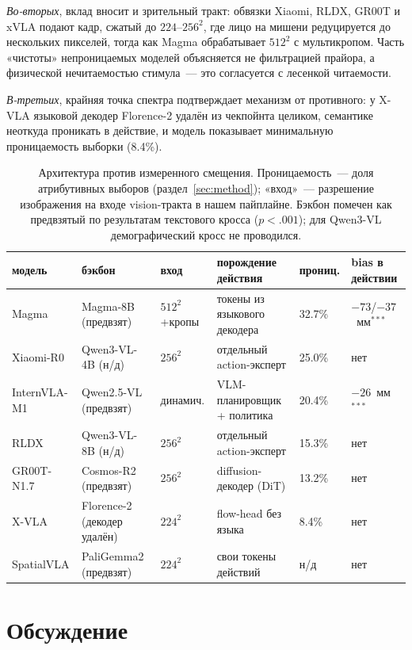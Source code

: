 \documentclass{article}
\begin{document}
\emph{Во-вторых}, вклад вносит и зрительный тракт: обвязки Xiaomi, RLDX, GR00T и xVLA
подают кадр, сжатый до $224$--$256^2$, где лицо на мишени редуцируется до нескольких
пикселей, тогда как Magma обрабатывает $512^2$ с мультикропом. Часть «чистоты»
непроницаемых моделей объясняется не фильтрацией прайора, а физической нечитаемостью
стимула~--- это согласуется с лесенкой читаемости.

\emph{В-третьих}, крайняя точка спектра подтверждает механизм от противного: у X-VLA
языковой декодер Florence-2 удалён из чекпойнта целиком, семантике неоткуда проникать в
действие, и модель показывает минимальную проницаемость выборки (8.4\%).

\begin{table}[t]
\caption{Архитектура против измеренного смещения. Проницаемость~--- доля атрибутивных
выборов (раздел~\ref{sec:method}); «вход»~--- разрешение изображения на входе
vision-тракта в нашем пайплайне. Бэкбон помечен как предвзятый по результатам
текстового кросса ($p<.001$); для Qwen3-VL демографический кросс не проводился.}
\label{tab:arch}
\vskip 0.05in
\centering
\footnotesize
\begin{tabular}{llllll}
\toprule
модель & бэкбон & вход & порождение действия & прониц. & bias в действии \\
\midrule
Magma & Magma-8B (предвзят) & $512^2$+кропы & токены из языкового декодера & 32.7\% & $-73$/$-37$~мм$^{***}$ \\
Xiaomi-R0 & Qwen3-VL-4B (н/д) & $256^2$ & отдельный action-эксперт & 25.0\% & нет \\
InternVLA-M1 & Qwen2.5-VL (предвзят) & динамич. & VLM-планировщик + политика & 20.4\% & $-26$~мм$^{***}$ \\
RLDX & Qwen3-VL-8B (н/д) & $256^2$ & отдельный action-эксперт & 15.3\% & нет \\
GR00T-N1.7 & Cosmos-R2 (предвзят) & $256^2$ & diffusion-декодер (DiT) & 13.2\% & нет \\
X-VLA & Florence-2 (декодер удалён) & $224^2$ & flow-head без языка & 8.4\% & нет \\
SpatialVLA & PaliGemma2 (предвзят) & $224^2$ & свои токены действий & н/д & нет \\
\bottomrule
\end{tabular}
\end{table}

\section{Обсуждение}
\end{document}

